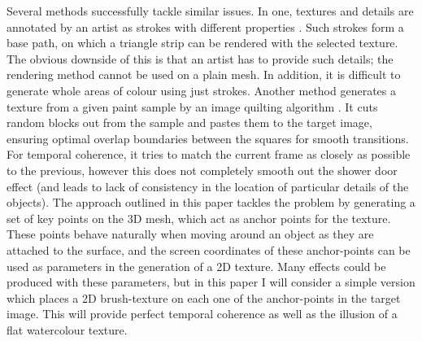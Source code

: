 \documentclass[a4paper,10pt]{article}
\begin{document}
Several methods successfully tackle similar issues. In one, textures and details are annotated by an artist as strokes with different properties \cite{Kalnins2002}. Such strokes form a base path, on which a triangle strip can be rendered with the selected texture. The obvious downside of this is that an artist has to provide such details; the rendering method cannot be used on a plain mesh. In addition, it is difficult to generate whole areas of colour using just strokes. Another method generates a texture from a given paint sample by an image quilting algorithm \cite{Kulla1989}. It cuts random blocks out from the sample and pastes them to the target image, ensuring optimal overlap boundaries between the squares for smooth transitions. For temporal coherence, it tries to match the current frame as closely as possible to the previous, however this does not completely smooth out the shower door effect (and leads to lack of consistency in the location of particular details of the objects). The approach outlined in this paper tackles the problem by generating a set of key points on the 3D mesh, which act as anchor points for the texture. These points behave naturally when moving around an object as they are attached to the surface, and the screen coordinates of these anchor-points can be used as parameters in the generation of a 2D texture. Many effects could be produced with these parameters, but in this paper I will consider a simple version which places a 2D brush-texture on each one of the anchor-points in the target image. This will provide perfect temporal coherence as well as the illusion of a flat watercolour texture.
\end{document}
